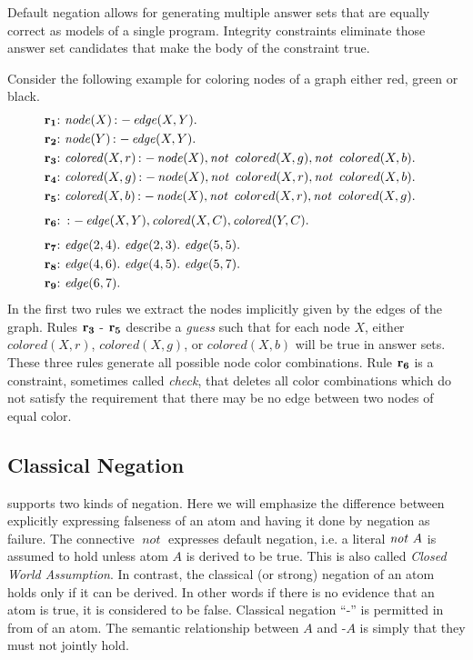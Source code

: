 \documentclass[a4paper, titlepage]{article}
\newcommand{\mi}[1]{\mathit{#1}}
\DeclareMathOperator{\leftimpl}{:-}
\DeclareMathOperator{\clasneg}{\text{-}}
\DeclareMathOperator{\nott}{\mathit{not}}
\newcommand{\row}[1]{%
  \ensuremath{\color{black}\ensuremath{\mathbf{#1}} \color{black}}%
}
\newcommand{\rowprefix}[1]{%
  \ensuremath{\color{black}\mathbf{#1{:}}\ }%
}
\begin{document}
Default negation allows for generating multiple answer sets
that are equally correct as models of a single program.
%
Integrity constraints eliminate those answer set candidates
that make the body of the constraint true.
\begin{exmp}
Consider the following example for coloring nodes of a graph
either red, green or black. 
\label{nodecoloring}
\begin{align*}
\rowprefix{r_1} & \mathit{node}(X) \leftimpl \mathit{edge}(X, Y).  &\\
\rowprefix{r_2} & \mathit{node}(Y) \leftimpl \mathit{edge}(X, Y).  & \\
\rowprefix{r_3} & \mathit{colored}(X, r) \leftimpl \mathit{node}(X), \nott \  colored(X,g), \nott \ colored(X,b). & \\
\rowprefix{r_4} & \mathit{colored}(X, g) \leftimpl \mathit{node}(X), \nott \  colored(X,r), \nott \ colored(X,b). & \\
\rowprefix{r_5} & \mathit{colored}(X, b) \leftimpl \mathit{node}(X), \nott \  colored(X,r), \nott \ colored(X,g). & \\[1ex]
\rowprefix{r_6} & \leftimpl \mathit{edge}(X, Y), \mathit{colored}
(X, C), \mathit{colored}(Y, C). & \\[1ex]
\rowprefix{r_7} & \mathit{edge}(2, 4). \  \mathit{edge}(2, 3). \  
\mathit{edge}(5, 5). & \\
\rowprefix{r_8} & \mathit{edge}(4, 6). \  \mathit{edge}(4, 5). \ 
\mathit{edge}(5, 7). & \\
\rowprefix{r_9} & \mathit{edge}(6, 7). &
\end{align*} 
In the first two rules we extract the nodes
implicitly given by the edges of the graph.
Rules \row{r_3}-\row{r_5} describe a \emph{guess}
such that for each node $X$,
either $\mi{colored}(X,r)$, $\mi{colored}(X,g)$, or $\mi{colored}(X,b)$
will be true in answer sets.
These three rules generate all possible node color combinations.
Rule \row{r_6} is a constraint, sometimes called \emph{check},
that
deletes all color combinations which do not satisfy the 
requirement that there may be no edge between two nodes of 
equal color.
\end{exmp}

\subsection{Classical Negation}
\dlvhex{} supports two kinds of negation. Here we will 
emphasize the difference between explicitly expressing 
falseness of an atom and having it done by 
negation as failure.
The connective $\nott$ expresses 
default negation, i.e. a literal $\nott \thinspace A$ is assumed 
to hold unless atom $A$ is derived to be true.
This is also called \emph{Closed World Assumption}.
In contrast, 
the classical (or strong) negation of an atom holds only if 
it can be derived. In other words if there is no evidence 
that an atom is true, it is considered to be false. 
Classical negation \enquote{$\clasneg$} is 
permitted in from of an atom. The semantic relationship 
between $A$ and $\clasneg\mathit{A}$ is simply that they must not jointly 
hold.
\end{document}
